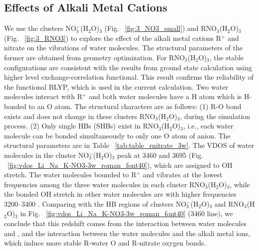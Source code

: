 \subsection{Effects of Alkali Metal Cations}
We use the clusters NO$_3^-$(H$_2$O)$_3$ (Fig. ~\ref{fig:3_NO3_small}) and RNO$_3$(H$_2$O)$_3$ (Fig. ~\ref{fig:3_RNO3}) to explore the effect of the alkali metal cations R$^{+}$ and nitrate on the vibrations of water molecules. 
The structural parameters of the former are obtained from geometry optimization.  
For RNO$_3$(H$_2$O)$_3$, the stable configurations are consistent with the results from ground state calculation using higher level exchange-correlation functional\cite{AC}.
This result confirms the reliability of the functional BLYP, which is used in the current calculation. 
Two water molecules interact with R$^+$ and both water molecules have a  H atom which is H-bonded to an O atom. 
The structural characters are as follows: 
(1) R-O bond exists  and does not change in these clusters RNO$_3$(H$_2$O)$_3$, during the simulation process.
(2) Only single HBs (SHBs) exist in RNO$_3$(H$_2$O)$_3$\cite{Pathak08}, i.e., each water molecule can be bonded simultaneously to only one O atom of \nitrate anion. 
The structural parameters are in Table ~\ref{tab:table_rnitrate_3w}. 
 The VDOS of water molecules in the cluster NO$_3^-$(H$_2$O)$_3$ peak at 3460 \centmeter and 3695 \cm(Fig. ~\ref{fig:vdos_Li_Na_K-NO3-3w_roman_font40}), which are assigned to OH stretch.\cite{JRS74} 
 The water molecules bounded to R$^+$ and \nitrate vibrates at the lowest frequencies among the three water molecules in each
 cluster RNO$_3$(H$_2$O)$_3$, while the bonded OH stretch in other water molecules are with higher frequencies 3200--3400 \centmeter.
 Comparing with the HB regions of clusters NO$_3^-$(H$_2$O)$_3$ and RNO$_3$(H$_2$O)$_3$ in Fig. ~\ref{fig:vdos_Li_Na_K-NO3-3w_roman_font40} (3460 \cm line), we conclude that this redshift comes from the interaction between water molecules and \nit, and the interaction between the water molecules and the alkali metal ions, which induce more stable R-water O and R-nitrate oxygen bonds.

